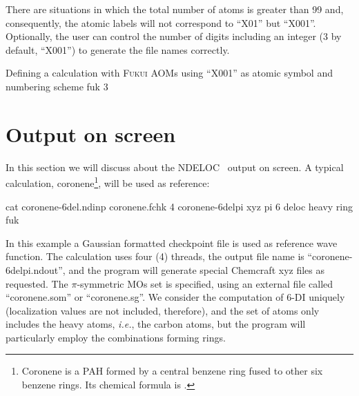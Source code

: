 \documentclass[a4paper,11pt,openany]{memoir}
\newcommand\programa{\textsc{NDELOC}}
\begin{document}
There are situations in which the total number of atoms is greater than 99 and, consequently, the atomic labels will not correspond to ``X01'' but ``X001''. Optionally, the user can control the number of digits including an integer (3 by default, ``X001'') to generate the file names correctly.
\begin{myexample}{Defining a calculation with \textsc{Fukui} \acp{AOM} using ``X001'' as atomic symbol and numbering scheme}
	fuk 3
\end{myexample}

\chapter{Output on screen}\label{chap:screen}
In this section we will discuss about the \programa~ output on screen. A typical calculation, coronene\footnote{Coronene is a \ac{PAH} formed by a central benzene ring fused to other six benzene rings. Its chemical formula is .}, will be used as reference:
\begin{consola}{cat coronene-6del.ndinp}
coronene.fchk 4
coronene-6delpi xyz
pi
6 deloc
heavy ring
fuk
\end{consola}
In this example a Gaussian formatted checkpoint file is used as reference wave function. The calculation uses four (4) threads, the output file name is ``coronene-6delpi.ndout'', and the program will generate special Chemcraft xyz files as requested. The $\pi$-symmetric \acp{MO} set is specified, using an external file called ``coronene.som'' or ``coronene.sg''. We consider the computation of 6-\ac{DI} uniquely (localization values are not included, therefore), and the set of atoms only includes the heavy atoms, \emph{i.e.}, the carbon atoms, but the program will particularly employ the combinations forming rings.
\end{document}

